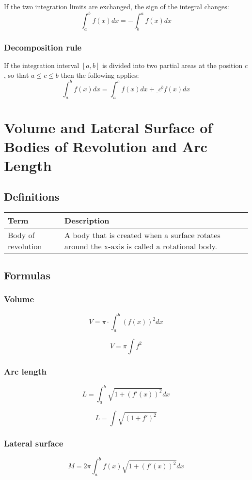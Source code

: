 \documentclass{book}
\begin{document}
If the two integration limits are exchanged, the sign of the integral changes:
\[
  \int_a^b f(x)dx = - \int_b^a f(x)dx
\]

\subsubsection{Decomposition rule}

If the integration interval $[a, b]$ is divided into two partial areas at the position $c$, so that $a \le c \le b$ then the following applies:
\[
  \int_a^b f(x)dx = \int_a^c f(x)dx + \_c^b f(x) dx
\]


\section{Volume and Lateral Surface of Bodies of Revolution and Arc Length}

\subsection{Definitions}

\begin{tabular}{p{3cm}p{10.5cm}}
  \toprule
  \textbf{Term} & \textbf{Description} \\
  \midrule
  Body of revolution & A body that is created when a surface rotates around the x-axis is called a rotational body.\\
  \bottomrule
\end{tabular}

\subsection{Formulas}

\subsubsection{Volume}

\[
  V= \pi \cdot \int_a^b(f(x))^2 dx
\]

\[
  V = \pi \int f^2
\]

\subsubsection{Arc length}

\[
  L = \int_a^b \sqrt{1+(f'(x))^2} dx
\]

\[
  L = \int \sqrt{(1+f')^2}
\]

\subsubsection{Lateral surface}
\[
  M = 2\pi \int_a^b f(x) \sqrt{1+(f'(x))^2}dx
\]
\end{document}
